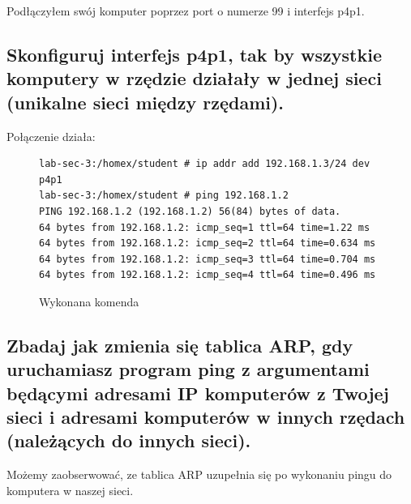 \documentclass[polish, a4paper]{article}
\begin{document}
Podłączyłem swój komputer poprzez port o numerze 99 i interfejs p4p1. 

\subsection{Skonfiguruj interfejs p4p1, tak by wszystkie komputery w rzędzie działały w jednej sieci (unikalne sieci między rzędami).}

Połączenie działa:

\begin{figure}[H]
\begin{verbatim}
lab-sec-3:/homex/student # ip addr add 192.168.1.3/24 dev p4p1
lab-sec-3:/homex/student # ping 192.168.1.2
PING 192.168.1.2 (192.168.1.2) 56(84) bytes of data.
64 bytes from 192.168.1.2: icmp_seq=1 ttl=64 time=1.22 ms
64 bytes from 192.168.1.2: icmp_seq=2 ttl=64 time=0.634 ms
64 bytes from 192.168.1.2: icmp_seq=3 ttl=64 time=0.704 ms
64 bytes from 192.168.1.2: icmp_seq=4 ttl=64 time=0.496 ms
\end{verbatim}
\caption{Wykonana komenda}
\end{figure}

\subsection{Zbadaj jak zmienia się tablica ARP, gdy uruchamiasz program ping z argumentami będącymi adresami IP komputerów z Twojej sieci i adresami komputerów w innych rzędach (należących do innych sieci).}

Możemy zaobserwować, ze tablica ARP uzupełnia się po wykonaniu pingu do komputera w naszej sieci.
\end{document}
